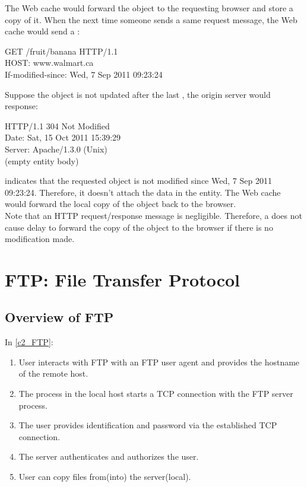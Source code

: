 The Web cache would forward the object to the requesting browser and store a copy of it.
When the next time someone sends a same request message, the Web cache would send a :

\begin{center}
    GET /fruit/banana HTTP/1.1\\
    HOST: www.walmart.ca\\
    If-modified-since: Wed, 7 Sep 2011 09:23:24
\end{center}

Suppose the object is not updated after the last , the origin server would response:

\begin{center}
    HTTP/1.1 304 Not Modified\\
    Date: Sat, 15 Oct 2011 15:39:29\\
    Server: Apache/1.3.0 (Unix)\\
    (empty entity body)
\end{center}

 indicates that the requested object is not modified since Wed, 7 Sep 2011 09:23:24.
Therefore, it doesn't attach the data in the entity. The Web cache would forward the local copy of the
object back to the browser.\\

Note that an HTTP request/response message is negligible. Therefore, a  does
not cause delay to forward the copy of the object to the browser if there is no modification made.



\newpage
\section{FTP: File Transfer Protocol}


\subsection{Overview of FTP}

\hf
In \autoref{c2_FTP}:
\begin{enumerate}
    \item User interacts with FTP with an FTP user agent and provides the hostname of the remote host.
    \item The process in the local host starts a TCP connection with the FTP server process.
    \item The user provides identification and password via the established TCP connection.
    \item The server authenticates and authorizes the user.
    \item User can copy files from(into) the server(local).
\end{enumerate}


